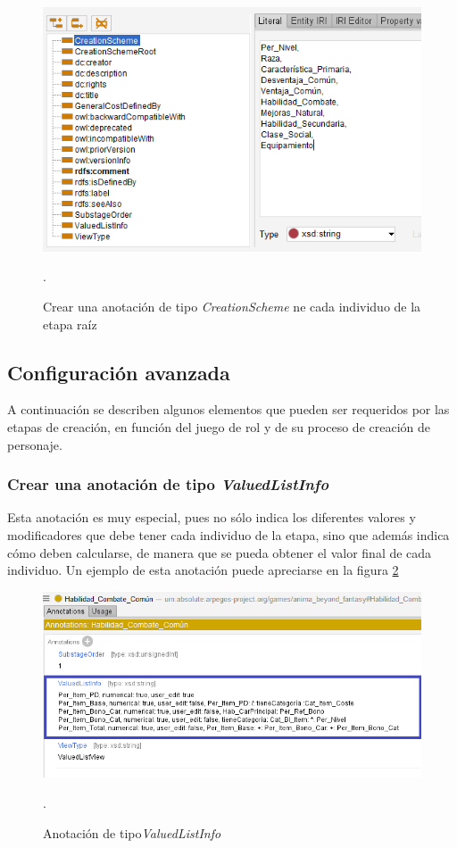 \begin{enumerate}
    \begin{figure}[H]
        \centering
        \includegraphics[scale=0.6]{Figures/Protege/CreationScheme.png}
        \caption{Crear una anotación de tipo \textit{CreationScheme} ne cada individuo de la etapa raíz}.
        \label{CreationScheme}
    \end{figure}
\end{enumerate}

\subsection{Configuración avanzada}
A continuación se describen algunos elementos que pueden ser requeridos por las etapas de creación, en función del juego de rol y 
de su proceso de creación de personaje.

\subsubsection{Crear una anotación de tipo \textit{ValuedListInfo}}\label{ValuedListInfo}
Esta anotación es muy especial, pues no sólo indica los diferentes valores y modificadores que debe tener cada individuo de la etapa, 
sino que además indica cómo deben calcularse, de manera que se pueda obtener el valor final de cada individuo. \newpage Un ejemplo de 
esta anotación puede apreciarse en la figura \ref*{ValuedListInfo_Begin}\medskip

\begin{figure}[H]
    \centering
    \includegraphics[scale=0.6]{Figures/Protege/ValuedListInfo_End.png}
    \caption{Anotación de tipo\textit{ValuedListInfo}}.
    \label{ValuedListInfo_Begin}
\end{figure}


